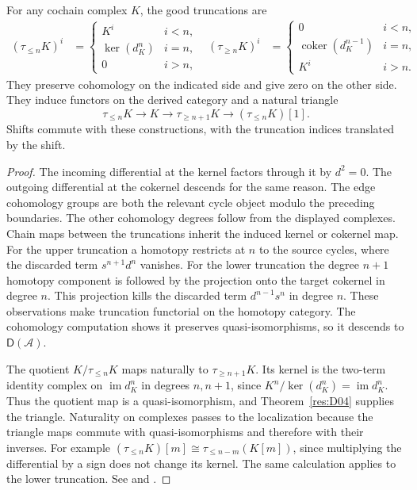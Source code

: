 \begin{proposition}\label{res:D05}
For any cochain complex \(K\), the good truncations are
\[
\begin{aligned}
 (\tau_{\le n}K)^i&=
  \begin{cases}
   K^i & i<n,\\
   \ker(d_K^n) & i=n,\\
   0 & i>n,
  \end{cases}
&
 (\tau_{\ge n}K)^i&=
  \begin{cases}
   0 & i<n,\\
   \operatorname{coker}(d_K^{n-1}) & i=n,\\
   K^i & i>n.
  \end{cases}
\end{aligned}
\]
They preserve cohomology on the indicated side and give zero on
the other side. They induce functors on the derived category and a
natural triangle
\[
 \tau_{\le n}K\longrightarrow K\longrightarrow\tau_{\ge n+1}K
       \longrightarrow(\tau_{\le n}K)[1].
\]
Shifts commute with these constructions, with the truncation indices
translated by the shift.
\end{proposition}
\begin{proof}
The incoming differential at the kernel factors through it by
\(d^2=0\). The outgoing differential at the cokernel descends for
the same reason. The edge cohomology groups are both the relevant
cycle object modulo the preceding boundaries. The other cohomology
degrees follow from the displayed complexes. Chain maps between
the truncations inherit the induced kernel or cokernel map. For the
upper truncation a homotopy restricts at \(n\) to the source cycles,
where the discarded term \(s^{n+1}d^n\) vanishes. For the lower
truncation the degree \(n+1\) homotopy component is followed by the
projection onto the target cokernel in degree \(n\). This projection
kills the discarded term \(d^{n-1}s^n\) in degree \(n\). These observations make truncation
functorial on the homotopy category. The cohomology computation
shows it preserves quasi-isomorphisms, so it descends to
\(\mathsf D(\mathcal A)\).

The quotient \(K/\tau_{\le n}K\) maps naturally to
\(\tau_{\ge n+1}K\). Its kernel is the two-term identity complex on
\(\operatorname{im}d_K^n\) in degrees \(n,n+1\), since
\(K^n/\ker(d_K^n)=\operatorname{im}d_K^n\). Thus the quotient map
is a quasi-isomorphism, and Theorem~\ref{res:D04} supplies the
triangle. Naturality on complexes passes to the localization because
the triangle maps commute with quasi-isomorphisms and therefore
with their inverses. For example
\((\tau_{\le n}K)[m]\cong\tau_{\le n-m}(K[m])\), since multiplying
the differential by a sign does not change its kernel. The same
calculation applies to the lower truncation.
See \cite[Tags 05RV and 08J5]{stacks-derived} and
\cite[Definition 7.3.6]{yekutieli}.
\end{proof}

